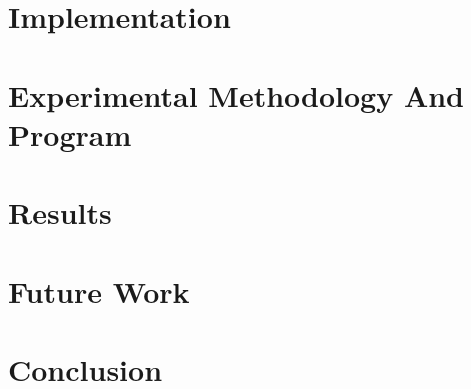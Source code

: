 \documentclass{report}
\begin{document}
\chapter{Implementation}
\label{chapter:implementation}


\chapter{Experimental Methodology And Program}
\label{chapter:experimental_methodology_and_program}


\chapter{Results}
\label{chapter:results}


\chapter{Future Work}
\label{chapter:future_work}


\chapter{Conclusion}
\label{chapter:conclusion}


\newpage

%  
% 
\end{document}
